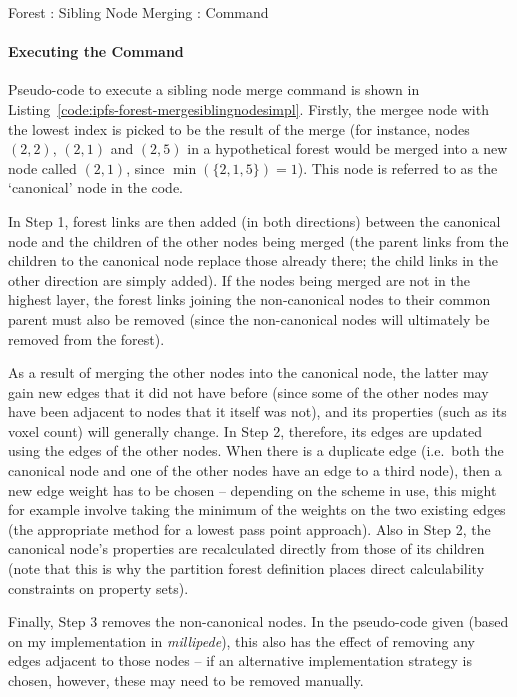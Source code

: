 \begin{stulisting}[p]
\caption{Forest : Sibling Node Merging : Command}
\label{code:ipfs-forest-mergesiblingnodescommand}

\end{stulisting}

\paragraph{Executing the Command}

Pseudo-code to execute a sibling node merge command is shown in Listing~\ref{code:ipfs-forest-mergesiblingnodesimpl}. Firstly, the mergee node with the lowest index is picked to be the result of the merge (for instance, nodes $(2,2)$, $(2,1)$ and $(2,5)$ in a hypothetical forest would be merged into a new node called $(2,1)$, since $\min(\{2,1,5\}) = 1$). This node is referred to as the `canonical' node in the code.

In Step 1, forest links are then added (in both directions) between the canonical node and the children of the other nodes being merged (the parent links from the children to the canonical node replace those already there; the child links in the other direction are simply added). If the nodes being merged are not in the highest layer, the forest links joining the non-canonical nodes to their common parent must also be removed (since the non-canonical nodes will ultimately be removed from the forest).

As a result of merging the other nodes into the canonical node, the latter may gain new edges that it did not have before (since some of the other nodes may have been adjacent to nodes that it itself was not), and its properties (such as its voxel count) will generally change. In Step 2, therefore, its edges are updated using the edges of the other nodes. When there is a duplicate edge (i.e.~both the canonical node and one of the other nodes have an edge to a third node), then a new edge weight has to be chosen -- depending on the scheme in use, this might for example involve taking the minimum of the weights on the two existing edges (the appropriate method for a lowest pass point approach). Also in Step 2, the canonical node's properties are recalculated directly from those of its children (note that this is why the partition forest definition places direct calculability constraints on property sets).

Finally, Step 3 removes the non-canonical nodes. In the pseudo-code given (based on my implementation in \emph{millipede}), this also has the effect of removing any edges adjacent to those nodes -- if an alternative implementation strategy is chosen, however, these may need to be removed manually.


